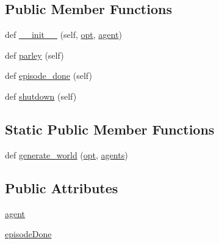 \subsection*{Public Member Functions}
\begin{DoxyCompactItemize}
\item 
def \hyperlink{classparlai_1_1messenger_1_1core_1_1worlds_1_1OnboardWorld_a1fdd4fed6940246e1aab71847e8054ee}{\+\_\+\+\_\+init\+\_\+\+\_\+} (self, \hyperlink{classparlai_1_1core_1_1worlds_1_1World_a3640d92718acd3e6942a28c1ab3678bd}{opt}, \hyperlink{classparlai_1_1messenger_1_1core_1_1worlds_1_1OnboardWorld_ace2a51f42d513a5e8224c7b24406fc41}{agent})
\item 
def \hyperlink{classparlai_1_1messenger_1_1core_1_1worlds_1_1OnboardWorld_a40f272e49b03edc9095deb71768abc5b}{parley} (self)
\item 
def \hyperlink{classparlai_1_1messenger_1_1core_1_1worlds_1_1OnboardWorld_ac16e62ae39fe8d63989beb7899ed5640}{episode\+\_\+done} (self)
\item 
def \hyperlink{classparlai_1_1messenger_1_1core_1_1worlds_1_1OnboardWorld_a241f259d163104f3a903b5366d6bd432}{shutdown} (self)
\end{DoxyCompactItemize}
\subsection*{Static Public Member Functions}
\begin{DoxyCompactItemize}
\item 
def \hyperlink{classparlai_1_1messenger_1_1core_1_1worlds_1_1OnboardWorld_adcde8666879f5bbae9be3b83976ac24c}{generate\+\_\+world} (\hyperlink{classparlai_1_1core_1_1worlds_1_1World_a3640d92718acd3e6942a28c1ab3678bd}{opt}, \hyperlink{classparlai_1_1core_1_1worlds_1_1World_a728f75194cc26ea4035047c46cf62608}{agents})
\end{DoxyCompactItemize}
\subsection*{Public Attributes}
\begin{DoxyCompactItemize}
\item 
\hyperlink{classparlai_1_1messenger_1_1core_1_1worlds_1_1OnboardWorld_ace2a51f42d513a5e8224c7b24406fc41}{agent}
\item 
\hyperlink{classparlai_1_1messenger_1_1core_1_1worlds_1_1OnboardWorld_a3cc57ec1b920d0b927d55ca24964315b}{episode\+Done}
\end{DoxyCompactItemize}



